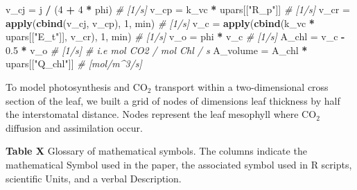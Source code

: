 \documentclass[12pt,halfline,a4paper,]{ouparticle}
\newenvironment{Shaded}{\begin{snugshade}}{\end{snugshade}}
\newcommand{\CommentTok}[1]{\textcolor[rgb]{0.56,0.35,0.01}{\textit{#1}}}
\newcommand{\DecValTok}[1]{\textcolor[rgb]{0.00,0.00,0.81}{#1}}
\newcommand{\FloatTok}[1]{\textcolor[rgb]{0.00,0.00,0.81}{#1}}
\newcommand{\FunctionTok}[1]{\textcolor[rgb]{0.13,0.29,0.53}{\textbf{#1}}}
\newcommand{\NormalTok}[1]{#1}
\newcommand{\OtherTok}[1]{\textcolor[rgb]{0.56,0.35,0.01}{#1}}
\newcommand{\SpecialCharTok}[1]{\textcolor[rgb]{0.81,0.36,0.00}{\textbf{#1}}}
\newcommand{\StringTok}[1]{\textcolor[rgb]{0.31,0.60,0.02}{#1}}
\begin{document}
\begin{Shaded}
\begin{Highlighting}[]
\NormalTok{v\_cj }\OtherTok{=}\NormalTok{ j }\SpecialCharTok{/}\NormalTok{ (}\DecValTok{4} \SpecialCharTok{+} \DecValTok{4} \SpecialCharTok{*}\NormalTok{ phi) }\CommentTok{\# [1/s]}
\NormalTok{v\_cp }\OtherTok{=}\NormalTok{ k\_vc }\SpecialCharTok{*}\NormalTok{ upars[[}\StringTok{"R\_p"}\NormalTok{]] }\CommentTok{\# [1/s]}
\NormalTok{v\_cr }\OtherTok{=} \FunctionTok{apply}\NormalTok{(}\FunctionTok{cbind}\NormalTok{(v\_cj, v\_cp), }\DecValTok{1}\NormalTok{, min) }\CommentTok{\# [1/s]}
\NormalTok{v\_c }\OtherTok{=} \FunctionTok{apply}\NormalTok{(}\FunctionTok{cbind}\NormalTok{(k\_vc }\SpecialCharTok{*}\NormalTok{ upars[[}\StringTok{"E\_t"}\NormalTok{]], v\_cr), }\DecValTok{1}\NormalTok{, min) }\CommentTok{\# [1/s]}
\NormalTok{v\_o }\OtherTok{=}\NormalTok{ phi }\SpecialCharTok{*}\NormalTok{ v\_c }\CommentTok{\# [1/s]}
\NormalTok{A\_chl }\OtherTok{=}\NormalTok{ v\_c }\SpecialCharTok{{-}} \FloatTok{0.5} \SpecialCharTok{*}\NormalTok{ v\_o }\CommentTok{\# [1/s] \# i.e mol CO2 / mol Chl / s}
\NormalTok{A\_volume }\OtherTok{=}\NormalTok{ A\_chl }\SpecialCharTok{*}\NormalTok{ upars[[}\StringTok{"Q\_chl"}\NormalTok{]] }\CommentTok{\# [mol/m\^{}3/s]}
\end{Highlighting}
\end{Shaded}

To model photosynthesis and CO\(_2\) transport within a two-dimensional
cross section of the leaf, we built a grid of nodes of dimensions leaf
thickness by half the interstomatal distance. Nodes represent the leaf
mesophyll where CO\(_2\) diffusion and assimilation occur.

\textbf{Table X} Glossary of mathematical symbols. The columns indicate
the mathematical Symbol used in the paper, the associated symbol used in
R scripts, scientific Units, and a verbal Description.
\end{document}
